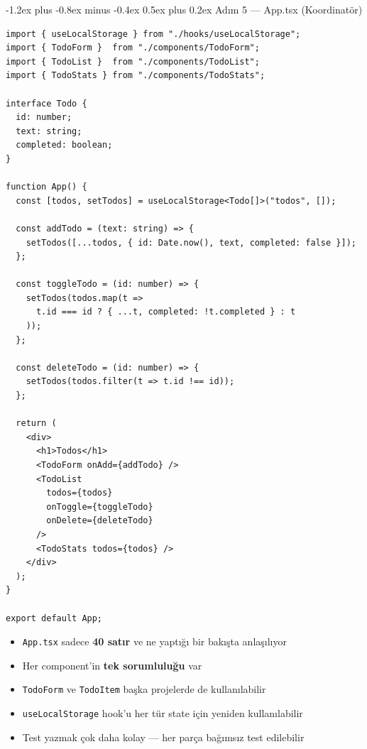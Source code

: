 \documentclass[12pt, a4paper]{article}
\makeatletter
\renewcommand{\subsection}{%
  \@startsection{subsection}{2}{\z@}%
    {-1.2ex plus -0.8ex minus -0.4ex}%
    {0.5ex plus 0.2ex}%
    {\normalfont\large\bfseries\sffamily\color{secondary}}%
}
\makeatother
\begin{document}
\vspace{6pt}

\subsection{Adım 5 --- App.tsx (Koordinatör)}

\begin{tcolorbox}[enhanced, colback=codebg, colframe=gray!30,
    colbacktitle=accent!85!black, coltitle=white, arc=4pt,
    title={\sffamily\bfseries\small src/App.tsx --- Sade ve net}]
\begin{lstlisting}[style=jsxstyle]
import { useLocalStorage } from "./hooks/useLocalStorage";
import { TodoForm }  from "./components/TodoForm";
import { TodoList }  from "./components/TodoList";
import { TodoStats } from "./components/TodoStats";

interface Todo {
  id: number;
  text: string;
  completed: boolean;
}

function App() {
  const [todos, setTodos] = useLocalStorage<Todo[]>("todos", []);

  const addTodo = (text: string) => {
    setTodos([...todos, { id: Date.now(), text, completed: false }]);
  };

  const toggleTodo = (id: number) => {
    setTodos(todos.map(t =>
      t.id === id ? { ...t, completed: !t.completed } : t
    ));
  };

  const deleteTodo = (id: number) => {
    setTodos(todos.filter(t => t.id !== id));
  };

  return (
    <div>
      <h1>Todos</h1>
      <TodoForm onAdd={addTodo} />
      <TodoList
        todos={todos}
        onToggle={toggleTodo}
        onDelete={deleteTodo}
      />
      <TodoStats todos={todos} />
    </div>
  );
}

export default App;
\end{lstlisting}
\end{tcolorbox}

\vspace{6pt}

\begin{infobox}
\begin{itemize}
  \item \texttt{App.tsx} sadece \textbf{40 satır} ve ne yaptığı bir bakışta anlaşılıyor
  \item Her component'in \textbf{tek sorumluluğu} var
  \item \texttt{TodoForm} ve \texttt{TodoItem} başka projelerde de kullanılabilir
  \item \texttt{useLocalStorage} hook'u her tür state için yeniden kullanılabilir
  \item Test yazmak çok daha kolay --- her parça bağımsız test edilebilir
\end{itemize}
\end{infobox}
\end{document}
